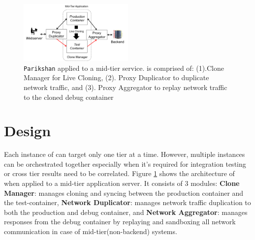 
\begin{figure}[h]
  \begin{center}
    \includegraphics[width=0.5\textwidth]{figs/arch.png}
    \caption{\texttt{Parikshan} applied to a mid-tier service. \parikshan is comprised of: (1).Clone Manager for Live Cloning, (2). Proxy Duplicator to duplicate network traffic, and (3). Proxy Aggregator to replay network traffic to the cloned debug container}
    \label{fig:workflow}
  \end{center}
\end{figure}

\section{Design}
\label{sec:design}
Each instance of \parikshan can target only one tier at a time.
However, multiple instances can be orchestrated together especially when it's required for integration testing or cross tier results need to be correlated.
Figure \ref{fig:workflow} shows the architecture of \parikshan when applied to a mid-tier application server.
It consists of 3 modules: 
\textbf{Clone Manager}: manages cloning and syncing between the production container and the test-container, 
\textbf{Network Duplicator}: manages network traffic duplication  to both the production and debug container, 
and \textbf{Network Aggregator}: manages responses from the debug container by replaying and sandboxing all network communication in case of mid-tier(non-backend) systems.


